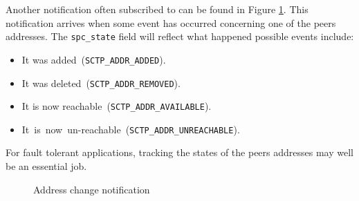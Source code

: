 \documentclass[conference]{IEEEtran}
\begin{document}
Another notification often subscribed to can be found in Figure \ref{fig:paddr}.
This notification arrives when some event has occurred concerning one of the peers
addresses. The \texttt{spc\_state} field will reflect what happened possible events include:

\begin{itemize}
 \item  It was added~(\texttt{SCTP\_ADDR\_ADDED}).
 \item  It was deleted~(\texttt{SCTP\_ADDR\_REMOVED}).
 \item  It is now reachable~(\texttt{SCTP\_ADDR\_AVAILABLE}).
 \item  It~is~now~un-reachable~(\texttt{SCTP\_ADDR\_UNREACHABLE}).
\end{itemize}

For fault tolerant applications, tracking the states of the peers addresses
may well be an essential job.

\begin{figure}

\caption{Address change notification}
\label{fig:paddr}
\end{figure}
\end{document}
